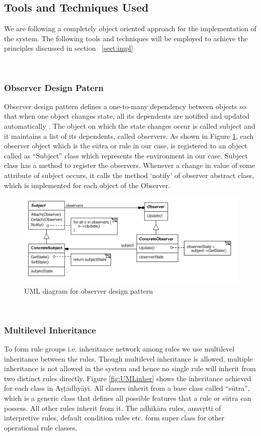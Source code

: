 \documentclass[11pt]{article}
\begin{document}
\subsection{Tools and Techniques Used}
\label{sect:tools}
We are following a completely object oriented approach for the implementation of the system.
The following tools and techniques will be employed to achieve the principles discussed in section ~\ref{sect:impl} 

\\
\subsubsection{Observer Design Patern}
Observer design pattern defines a one-to-many dependency between objects so that when one object changes state, all its dependents are notified and updated automatically \cite{obs}. The object on which the state changes occur is called subject and it maintains a list of its dependents, called observers. As shown in Figure \ref{fig:obsUML}, each observer object which is the sūtra or rule in our case, is registered to an object called as “Subject” class which represents the environment in our case. Subject class has a method to register the observers. Whenever a change in value of some attribute of subject occurs, it calls the method `notify' of observer abstract class, which is implemented for each object of the Observer.

\begin{figure}[h]
    \centering
	\includegraphics[width=\textwidth]{obsUML}
    \caption{UML diagram for observer design pattern}
    \label{fig:obsUML}
\end{figure}

\\
\subsubsection{Multilevel Inheritance}

To form rule groups i.e. inheritance network among rules we use multilevel inheritance between the rules. Though multilevel inheritance is allowed, multiple inheritance is not allowed in the system and hence no single rule will inherit from two distinct rules directly. Figure \ref{fig:UMLinher}
shows the inheritance achieved for each class in Aṣṭādhyāyī. All classes inherit from a base class
called ``sūtra'', which is a generic class that defines all possible features that a rule or sūtra can possess. All other rules inherit from it. The adhikāra rules, anuvṛtti of interpretive rules, default condition rules etc. form super class for other operational rule classes. 
\end{document}
